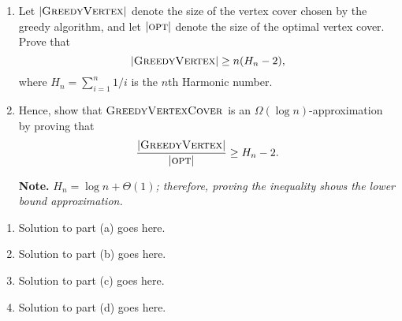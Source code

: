 \documentclass{article}
\begin{document}
\begin{question}
\begin{enumerate}[label = (\alph*)]
    \item Let $\lvert \mathsf{\textsc{GreedyVertex}} \rvert$ denote the size of the vertex cover chosen by the greedy algorithm, and let $\lvert \mathsf{\textsc{opt}}\rvert$ denote the size of the optimal vertex cover. Prove that \[\lvert \mathsf{\textsc{GreedyVertex}} \rvert \geq n(H_n - 2),\] where $H_n = \sum_{i = 1}^n 1/i$ is the $n$th Harmonic number.
    
    \item Hence, show that $\mathsf{\textsc{GreedyVertexCover}}$ is an $\Omega(\log n)$-approximation by proving that \[\frac{\lvert \mathsf{\textsc{GreedyVertex}} \rvert}{\lvert \mathsf{\textsc{opt}} \rvert} \geq H_n - 2.\]

    {\bfseries Note.} {\em $H_n = \log n + \Theta(1)$; therefore, proving the inequality shows the lower bound approximation.}
\end{enumerate}
\end{question}

\begin{solution}
\begin{enumerate}[label = (\alph*)]
    \item Solution to part (a) goes here.

    \item Solution to part (b) goes here.

    \item Solution to part (c) goes here.
    
    \item Solution to part (d) goes here.
\end{enumerate}
\end{solution}
\end{document}
